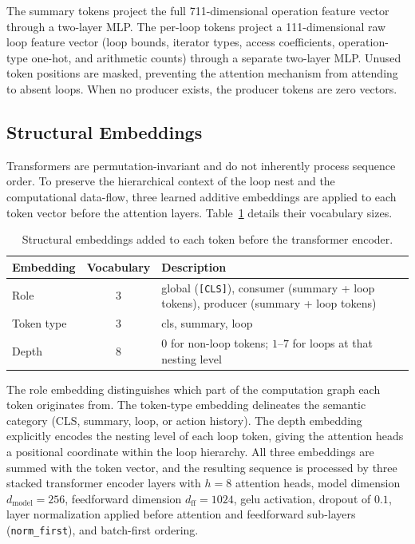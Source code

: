 The summary tokens project the full 711-dimensional operation feature vector through a two-layer MLP. The per-loop tokens project a 111-dimensional raw loop feature vector (loop bounds, iterator types, access coefficients, operation-type one-hot, and arithmetic counts) through a separate two-layer MLP. Unused token positions are masked, preventing the attention mechanism from attending to absent loops. When no producer exists, the producer tokens are zero vectors.

\subsection{Structural Embeddings}
Transformers are permutation-invariant and do not inherently process sequence order. To preserve the hierarchical context of the loop nest and the computational data-flow, three learned additive embeddings are applied to each token vector before the attention layers. Table~\ref{tab:structural-embeddings} details their vocabulary sizes.

\begin{table}[H]
    \centering
    \caption{Structural embeddings added to each token before the transformer encoder.}
    \label{tab:structural-embeddings}
    \vspace{0.2cm}
    \begin{tabularx}{\textwidth}{l c X}
        \toprule
        \textbf{Embedding} & \textbf{Vocabulary} & \textbf{Description} \\
        \midrule
        Role & 3 & global (\texttt{[CLS]}), consumer (summary + loop tokens), producer (summary + loop tokens) \\
        Token type & 3 & cls, summary, loop \\
        Depth & 8 & 0 for non-loop tokens; $1$--$7$ for loops at that nesting level \\
        \bottomrule
    \end{tabularx}
\end{table}

The role embedding distinguishes which part of the computation graph each token originates from. The token-type embedding delineates the semantic category (CLS, summary, loop, or action history). The depth embedding explicitly encodes the nesting level of each loop token, giving the attention heads a positional coordinate within the loop hierarchy. All three embeddings are summed with the token vector, and the resulting sequence is processed by three stacked transformer encoder layers with $h = 8$ attention heads, model dimension $d_\text{model} = 256$, feedforward dimension $d_\text{ff} = 1024$, \gls{gelu} activation, dropout of $0.1$, layer normalization applied before attention and feedforward sub-layers (\texttt{norm\_first}), and batch-first ordering.

